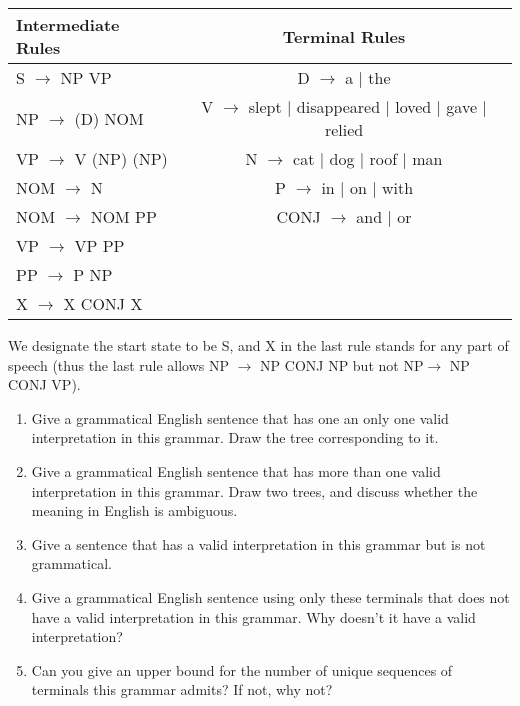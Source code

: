 \documentclass[11pt,twoside]{article}
\begin{document}
\begin{center}
\begin{tabular}{lc}
Intermediate Rules 	& Terminal Rules \\
\hline
S $\rightarrow$ NP VP &  D $\rightarrow$ a $|$ the \\
NP $\rightarrow$ (D) NOM & V $\rightarrow$ slept $|$ disappeared $|$ loved $|$ gave $|$ relied \\
 VP $\rightarrow$ V (NP) (NP) & N $\rightarrow$ cat $|$ dog $|$ roof $|$ man \\
  NOM $\rightarrow$ N  &  P $\rightarrow$ in $|$ on $|$ with \\
  NOM  $\rightarrow$ NOM PP & CONJ $\rightarrow$ and $|$ or \\
   VP  $\rightarrow$  VP PP &  \\
    PP  $\rightarrow$  P NP &  \\
    X   $\rightarrow$  X CONJ X &  \\
\end{tabular}
\end{center}

We designate the start state to be S, and X in the last rule stands for any part of speech (thus the last rule allows NP  $\rightarrow$  NP CONJ NP but not NP$\rightarrow$  NP CONJ VP).  

\begin{enumerate}
\item Give a grammatical English sentence that has one an only one valid interpretation in this grammar.  Draw the tree corresponding to it.
\item Give a grammatical English sentence that has more than one valid interpretation in this grammar.  Draw two trees, and discuss whether the meaning in English is ambiguous.
\item Give a sentence that has a valid interpretation in this grammar but is not grammatical.
\begin{comment}
The dog slept the man.
\end{comment}
\item Give a grammatical English sentence using only these terminals that does not have a valid interpretation in this grammar.  Why doesn't it have a valid interpretation?
\begin{comment}
And the man slept.
With the dog the man slept.
\end{comment}
\item Can you give an upper bound for the number of unique sequences of terminals this grammar admits?  If not, why not?
\end{enumerate}
\end{document}
